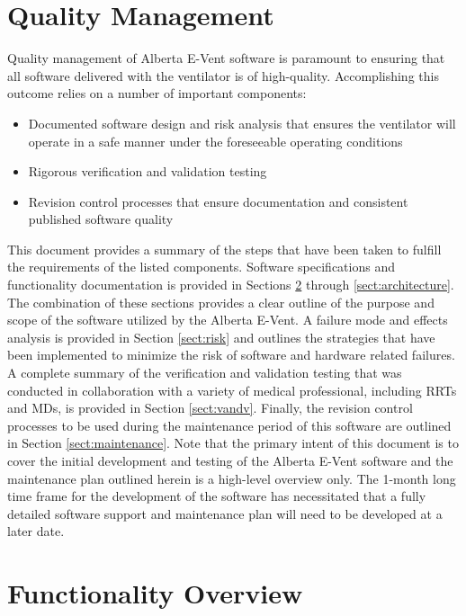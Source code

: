 \documentclass[]{article}
\begin{document}
\section{Quality Management}
\label{sect:quality_manage}
Quality management of Alberta E-Vent software is paramount to ensuring that all software delivered with the ventilator is of high-quality.  Accomplishing this outcome relies on a number of important components:
\begin{itemize}
	\item Documented software design and risk analysis that ensures the ventilator will operate in a safe manner under the foreseeable operating conditions
	\item Rigorous verification and validation testing
	\item Revision control processes that ensure  documentation and consistent published software quality
\end{itemize}

\noindent This document provides a summary of the steps that have been taken to fulfill the requirements of the listed components.
Software specifications and functionality documentation is provided in Sections \ref{sect:function_overview} through \ref{sect:architecture}.  The combination of these sections provides a clear outline of the purpose and scope of the software utilized by the Alberta E-Vent.  A failure mode and effects analysis is provided in Section \ref{sect:risk} and outlines the strategies that have been implemented to minimize the risk of software and hardware related failures.
A complete summary of the verification and validation testing that was conducted in collaboration with a variety of medical professional, including RRTs and MDs, is provided in Section \ref{sect:vandv}.
Finally, the revision control processes to be used during the maintenance period of this software are outlined in Section \ref{sect:maintenance}.  Note that the primary intent of this document is to cover the initial development and testing of the Alberta E-Vent software and the maintenance plan outlined herein is a high-level overview only.  The 1-month long time frame for the development of the software has necessitated that a fully detailed software support and maintenance plan will need to be developed at a later date.


\clearpage
\section{Functionality Overview}
\label{sect:function_overview}
\end{document}
